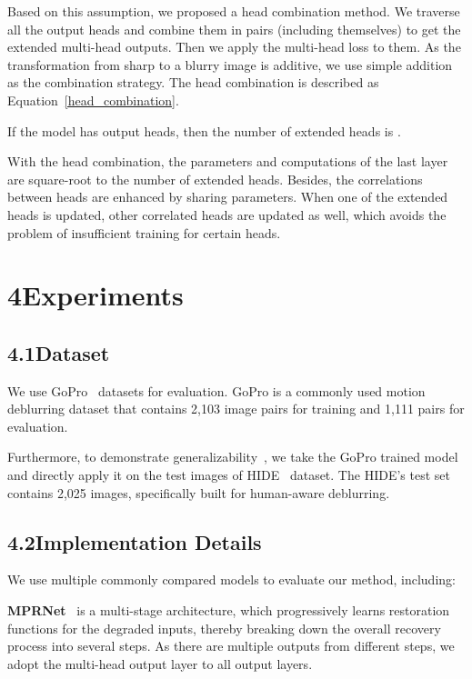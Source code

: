 \documentclass[letterpaper]{article} \usepackage{aaai23}  \usepackage{times}  \usepackage{helvet}  \usepackage{courier}  \usepackage[hyphens]{url}  \usepackage{graphicx} \urlstyle{rm} \def\UrlFont{\rm}  \usepackage{natbib}  \usepackage{caption} \frenchspacing  \setlength{\pdfpagewidth}{8.5in} \setlength{\pdfpageheight}{11in} \usepackage{algorithm}
\begin{document}
Based on this assumption, we proposed a head combination method. We traverse all the output heads and combine them in pairs (including themselves) to get the extended multi-head outputs. Then we apply the multi-head loss to them. As the transformation from sharp to a blurry image is additive, we use simple addition as the combination strategy. The head combination is described as Equation~\ref{head_combination}.



If the model has  output heads, then the number of extended heads is . 

With the head combination, the parameters and computations of the last layer are square-root to the number of extended heads. Besides, the correlations between heads are enhanced by sharing parameters. When one of the extended heads is updated, other correlated heads are updated as well, which avoids the problem of insufficient training for certain heads.

\section{4\quad Experiments}

\subsection{4.1\quad Dataset}

We use GoPro~\cite{Nah_2017_CVPR} datasets for evaluation. GoPro is a commonly used motion deblurring dataset that contains 2,103 image pairs for training and 1,111 pairs for evaluation. 

Furthermore, to demonstrate generalizability~\cite{zamir2021multi, wang2022uformer, chen2022simple}, we take the GoPro trained model and directly apply it on the test images of HIDE~\cite{shen2019human} dataset. The HIDE's test set contains 2,025 images, specifically built for human-aware deblurring. 

\subsection{4.2\quad Implementation Details}

We use multiple commonly compared models to evaluate our method, including:

\textbf{MPRNet}~\cite{zamir2021multi} is a multi-stage architecture, which progressively learns restoration functions for the degraded inputs, thereby breaking down the overall recovery process into several steps. As there are multiple outputs from different steps, we adopt the multi-head output layer to all output layers.
\end{document}
